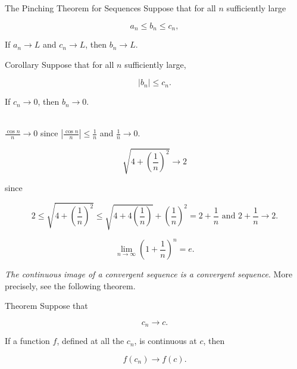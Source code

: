         \begin{theorem}{The Pinching Theorem for Sequences}
            Suppose that for all $n$ sufficiently large

            \[
                a_n \leq b_n \leq c_n,
            \]

            If $a_n \to L$ and $c_n \to L$, then $b_n \to L$.
        \end{theorem}

        \begin{corollemma}{Corollary}
            Suppose that for all $n$ sufficiently large,

            \[
                |b_n| \leq c_n.
            \]

            If $c_n \to 0$, then $b_n \to 0$.
        \end{corollemma}

        \textit{} \\

        $\frac{\cos{n}}{n} \to 0$ since $\left|\frac{\cos{n}}{n}\right| \leq \frac{1}{n}$ and $\frac{1}{n}\to 0.$ \\

        \textit{}

        \[
            \sqrt{4 + \left(\frac{1}{n}\right)^2} \to 2
        \]

        since

        \[
            2 \leq \sqrt{4 + \left(\frac{1}{n}\right)^2} \leq \sqrt{4 + 4\left(\frac{1}{n}\right)} + \left(\frac{1}{n}\right)^2 = 2 + \frac{1}{n} \text{ and } 2 + \frac{1}{n} \to 2.
        \]

        \textbf{}

        \[
            \lim_{n\to\infty} \left(1+ \frac{1}{n}\right)^n = e.
        \]

        \textit{The continuous image of a convergent sequence is a convergent sequence}. More precisely, see the following theorem.

        \begin{theorem}{Theorem}
            Suppose that

            \[
                c_n \to c.
            \]

            If a function $f$, defined at all the $c_n$, is continuous at $c$, then

            \[
                f(c_n) \to f(c).
            \]
        \end{theorem}

